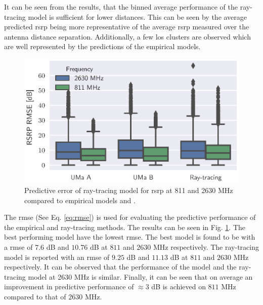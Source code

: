 It can be seen from the results, that the binned average performance of the ray-tracing model is sufficient for lower distances. This can be seen by the average predicted \gls{rsrp} being more representative of the average \gls{rsrp} measured over the antenna distance separation. Additionally, a few \gls{los} clusters are observed which are well represented by the predictions of the empirical models. 



\begin{figure}
    \centering
    \includegraphics{chapters/part_pathloss/figures/results/improved_boxplot_results_comparison_ghz.eps}
    \caption{Predictive error of ray-tracing model for \gls{rsrp} at 811 and 2630 MHz compared to empirical models  and .}
    \label{fig:rmse_boxplot_rsrp_comparison}
\end{figure}


The \gls{rmse} (See Eq. \ref{eq:rmse}) is used for evaluating the predictive performance of the empirical and ray-tracing methods. The results can be seen in Fig. \ref{fig:rmse_boxplot_rsrp_comparison}. The best performing model have the lowest \gls{rmse}. The best model is found to be  with a \gls{rmse} of $7.6$ dB and $10.76$ dB at $811$ and $2630$ MHz respectively. The ray-tracing model is reported with an \gls{rmse} of $9.25$ dB and $11.13$ dB at $811$ and $2630$ MHz respectively. It can be observed that the performance of the  model and the ray-tracing model at 2630 MHz is similar. Finally, it can be seen that on average an improvement in predictive performance of $\approx 3$ dB is achieved on $811$ MHz compared to that of $2630$ MHz.



